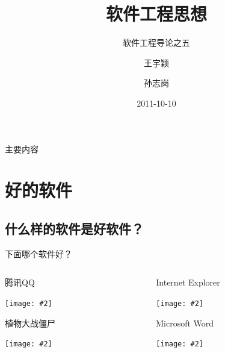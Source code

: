 \documentclass[]{beamer}
\title[Thinking in SE]
{软件工程思想}
\subtitle
{软件工程导论之五} %
\author[\url{http://sunner.cn}] %
{王宇颖 \and 孙志岗}
\institute[哈尔滨工业大学] %
{
  计算机科学与技术学院\\
  哈尔滨工业大学}
\date[Short Occasion] %
{2011-10-10}
\begin{document}
\begin{frame}
  \titlepage
\end{frame}

\begin{frame}{主要内容}
  \tableofcontents
\end{frame}




\section{好的软件}

\subsection{什么样的软件是好软件？}

\newenvironment{iconblock}[2]{
    \begin{block}{#1}
    \begin{center}
    \texttt{[image: \#2]}}
{\end{center}
    \end{block}
}

\begin{frame}{下面哪个软件好？}
  \begin{columns}[T]
    \begin{column}{4cm}
      \begin{iconblock}{腾讯QQ}{qq.jpg}\end{iconblock}
      \begin{iconblock}{植物大战僵尸}{pvz.jpg}\end{iconblock}
    \end{column}
    \begin{column}{4cm}
      \begin{iconblock}{Internet Explorer}{ie.png}\end{iconblock}
      \begin{iconblock}{Microsoft Word}{word.png}\end{iconblock}
    \end{column}
  \end{columns}

\end{frame}
\end{document}
